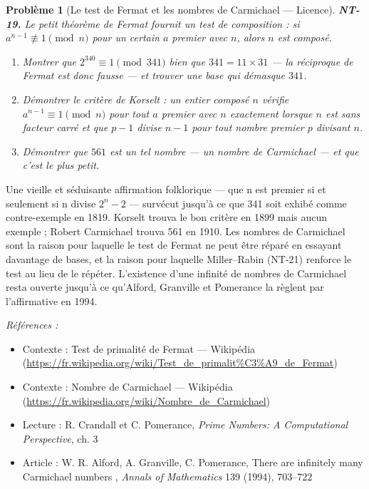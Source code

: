 \documentclass[11pt]{article}
\newtheorem{problem}{Problème}
\newenvironment{refs}{\par\small\noindent\emph{Références :}\begin{itemize}\setlength\itemsep{0pt}}{\end{itemize}\normalsize}
\begin{document}
\bigskip

\begin{problem}[{Le test de Fermat et les nombres de Carmichael --- Licence}]
\textbf{NT-19.} Le petit théorème de Fermat fournit un test de
composition : si $a^{n-1} \not\equiv 1 \pmod n$ pour un certain $a$ premier avec $n$, alors
$n$ est composé.
\begin{enumerate}
\item[(i)] Montrer que $2^{340} \equiv 1 \pmod{341}$ bien que
$341 = 11 \times 31$ --- la réciproque de Fermat est donc fausse --- et trouver une base qui démasque
$341$.
\item[(ii)] Démontrer le critère de Korselt : un entier composé $n$ vérifie
$a^{n-1} \equiv 1 \pmod n$ pour \textit{tout} $a$ premier avec $n$ exactement lorsque
$n$ est sans facteur carré et que $p - 1$ divise $n - 1$ pour tout nombre premier $p$
divisant $n$.
\item[(iii)] Démontrer que $561$ est un tel nombre --- un nombre de Carmichael --- et que
c'est le plus petit.
\end{enumerate}

\end{problem}

\noindent Une vieille et séduisante affirmation folklorique --- que n est premier si et
seulement si n divise $2^n - 2$ --- survécut jusqu'à ce que 341 soit exhibé comme contre-exemple en
1819. Korselt trouva le bon critère en 1899 mais aucun exemple ; Robert Carmichael trouva 561 en
1910. Les nombres de Carmichael sont la raison pour laquelle le test de Fermat ne peut être réparé
en essayant davantage de bases, et la raison pour laquelle Miller--Rabin (NT-21) renforce le test au
lieu de le répéter. L'existence d'une infinité de nombres de Carmichael resta ouverte jusqu'à ce
qu'Alford, Granville et Pomerance la règlent par l'affirmative en 1994.

\begin{refs}
\item Contexte : Test de primalité de Fermat --- Wikipédia (\url{https://fr.wikipedia.org/wiki/Test_de_primalit%C3%A9_de_Fermat})
\item Contexte : Nombre de Carmichael --- Wikipédia (\url{https://fr.wikipedia.org/wiki/Nombre_de_Carmichael})
\item Lecture : R. Crandall et C. Pomerance, \textit{Prime Numbers: A Computational Perspective}, ch. 3
\item Article : W. R. Alford, A. Granville, C. Pomerance, \og{} There are infinitely many Carmichael numbers \fg{}, \textit{Annals of Mathematics} 139 (1994), 703--722
\end{refs}
\end{document}
